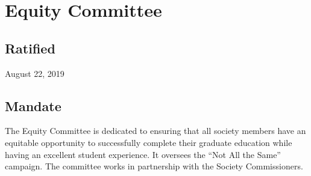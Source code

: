 \section{Equity Committee}

\subsection{Ratified}
August 22, 2019

\subsection{Mandate}
The Equity Committee is dedicated to ensuring that all society members have an equitable opportunity to successfully complete their graduate education while having an excellent student experience. It oversees the “Not All the Same” campaign. The committee works in partnership with the Society Commissioners.

